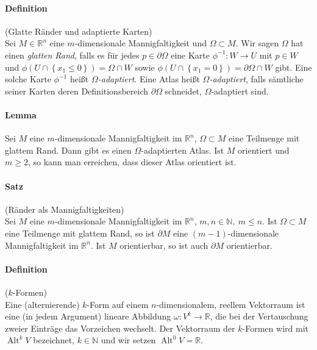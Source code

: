 \documentclass[12pt,a4paper,fleqn]{article}
\def\set#1{{\left\{ #1 \right\}}}
\def\R{{\mathbb{R}}}
\begin{document}
\paragraph{Definition} (Glatte Ränder und adaptierte Karten)\\
Sei $M \in \R^n$ eine $m$-dimensionale Mannigfaltigkeit und $\Omega \subset M$. Wir sagen $\Omega$ hat einen \textit{glatten Rand}, falls es für jedes $p \in \partial\Omega$ eine Karte $\phi^{-1}\colon W \rightarrow U$ mit $p \in W$ und $\phi(U \cap \set{x_1 \leq 0}) = \Omega \cap W$ sowie $\phi (U \cap \set{x_1 = 0}) = \partial \Omega \cap W$ gibt. Eine solche Karte $\phi^{-1}$ heißt $\Omega$\textit{-adaptiert}. Eine Atlas heißt $\Omega$\textit{-adaptiert}, falls sämtliche seiner Karten deren Definitionsbereich $\partial\Omega$ schneidet, $\Omega$-adaptiert sind.

\paragraph{Lemma} Sei $M$ eine $m$-dimensionale Mannigfaltigkeit im $\R^n$, $\Omega \subset M$ eine Teilmenge mit glattem Rand. Dann gibt es einen $\Omega$-adaptierten Atlas. Ist $M$ orientiert und $m \geq 2$, so kann man erreichen, dass dieser Atlas orientiert ist.

\paragraph{Satz} (Ränder als Mannigfaltigkeiten)\\
Sei $M$ eine $m$-dimensionale Mannigfaltigkeit im $\R^n$, $m, n \in \mathbb{N},\ m \leq n$. Ist $\Omega \subset M$ eine Teilmenge mit glattem Rand, so ist $\partial M$ eine $(m - 1)$-dimensionale Mannigfaltigkeit im $\R^n$. Ist $M$ orientierbar, so ist auch $\partial M$ orientierbar.

\paragraph{Definition} ($k$-Formen)\\
Eine (alternierende) $k$-Form auf einem $n$-dimensionalem, reellem Vektorraum ist eine (in jedem Argument) lineare Abbildung $\omega\colon V^k \rightarrow \R$, die bei der Vertauschung zweier Einträge das Vorzeichen wechselt. Der Vektorraum der $k$-Formen wird mit $\operatorname{Alt}^k V$ bezeichnet, $k \in \mathbb{N}$ und wir setzen $\operatorname{Alt}^0 V = \R$.
\end{document}
